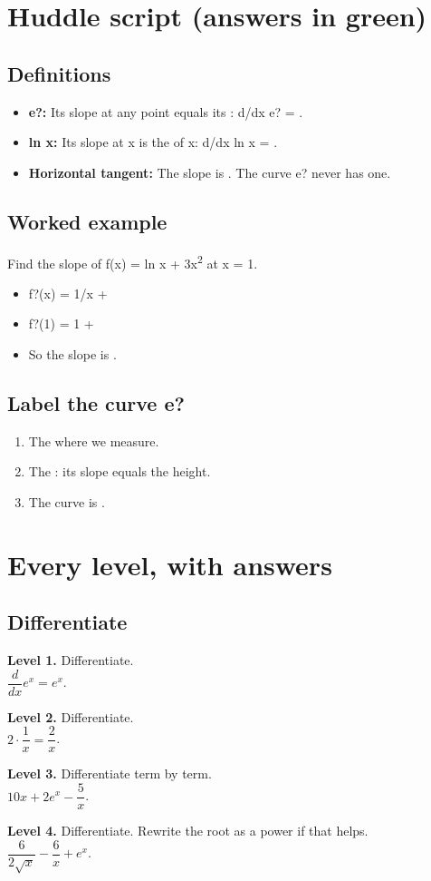 \documentclass[11pt]{article}
\begin{document}
\section*{Huddle script (answers in green)}
\subsection*{Definitions}\begin{itemize}
\item \textbf{e?:} Its slope at any point equals its : d/dx e? = .
\item \textbf{ln x:} Its slope at x is the  of x: d/dx ln x = .
\item \textbf{Horizontal tangent:} The slope is . The curve e? never has one.
\end{itemize}
\subsection*{Worked example}
Find the slope of f(x) = ln x + 3x\textsuperscript{2} at x = 1.\\
\begin{itemize}
\item f?(x) = 1/x + 
\item f?(1) = 1 + 
\item So the slope is .
\end{itemize}
\subsection*{Label the curve e?}
\begin{enumerate}
\item The  where we measure.
\item The : its slope equals the height.
\item The curve is .
\end{enumerate}
\section*{Every level, with answers}
\subsection*{Differentiate}
\noindent\textbf{Level 1.} Differentiate.\\  \quad $\dfrac{d}{dx}e^{x}=e^{x}$.\par\medskip
\noindent\textbf{Level 2.} Differentiate.\\  \quad $2\cdot\dfrac{1}{x}=\dfrac{2}{x}$.\par\medskip
\noindent\textbf{Level 3.} Differentiate term by term.\\  \quad $10x+2e^{x}-\dfrac{5}{x}$.\par\medskip
\noindent\textbf{Level 4.} Differentiate. Rewrite the root as a power if that helps.\\  \quad $\dfrac{6}{2\sqrt{x}}-\dfrac{6}{x}+e^{x}$.\par\medskip
\end{document}
